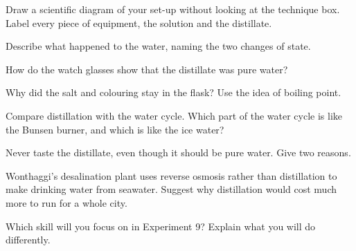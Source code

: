 \task Draw a scientific diagram of your set-up without looking at the technique box. Label every piece of equipment, the solution and the distillate. 
\drawbox{9cm}{}


\task Describe what happened to the water, naming the two changes of state.
\answerbox{4cm}

\task How do the watch glasses show that the distillate was pure water? 
\answerbox{4cm}

\task Why did the salt and colouring stay in the flask? Use the idea of boiling point.
\answerbox{4cm}

\task Compare distillation with the water cycle. Which part of the water cycle is like the Bunsen burner, and which is like the ice water? 
\answerbox{4.5cm}

\task Never taste the distillate, even though it should be pure water. Give two reasons.
\answerbox{3.5cm}

\begin{yr8box}
\begin{keepext}
\exttask Wonthaggi's desalination plant uses reverse osmosis rather than distillation to make drinking water from seawater. Suggest why distillation would cost much more to run for a whole city.
\answerbox{4.5cm}
\end{keepext}
\end{yr8box}


\begin{skillcheck}
\end{skillcheck}

\task Which skill will you focus on in Experiment 9? Explain what you will do differently.
\answerbox{5cm}
